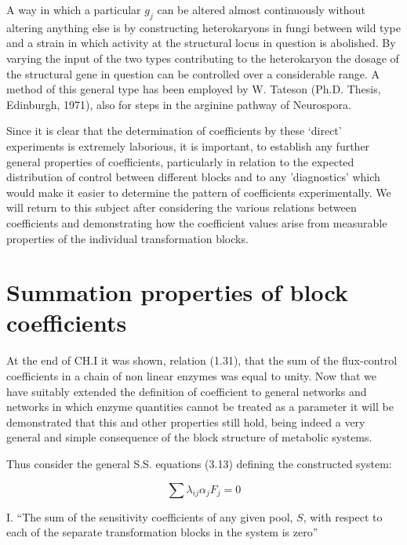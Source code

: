 A way in which a particular $g_{j}$ can be altered almost continuously without altering anything else is by constructing heterokaryons in fungi between wild type and a strain in which activity at the structural locus in question is abolished. By varying the input of the two types contributing to the heterokaryon the dosage of the structural gene in question can be controlled over a considerable range. A method of this general type has been employed by W. Tateson (Ph.D. Thesis, Edinburgh, 1971), also for steps in the arginine pathway of Neurospora.

Since it is clear that the determination of coefficients by these `direct' experiments is extremely laborious, it is important, to establish any further general properties of coefficients, particularly in relation to the expected distribution of control between different blocks and to any 'diagnostics' which would make it easier to determine the pattern of coefficients experimentally. We will return to this subject after considering the various relations between coefficients and demonstrating how the coefficient values arise from measurable properties of the individual transformation blocks.

\section{Summation properties of block coefficients}

At the end of CH.I it was shown, relation (1.31), that the sum of the flux-control coefficients in a chain of non linear enzymes was equal to unity. Now that we have suitably extended the definition of
coefficient to general networks and networks in which enzyme quantities cannot be treated as a parameter it will be demonstrated that this and other properties still hold, being indeed a very general and simple consequence of the block structure of metabolic systems.

Thus consider the general S.S. equations (3.13) defining the constructed system:

$$
\sum \lambda_{ij} \alpha_j F_j = 0
$$

I. ``The sum of the sensitivity coefficients of any given pool, $S$, with respect to each of the separate transformation blocks in the system is zero''


